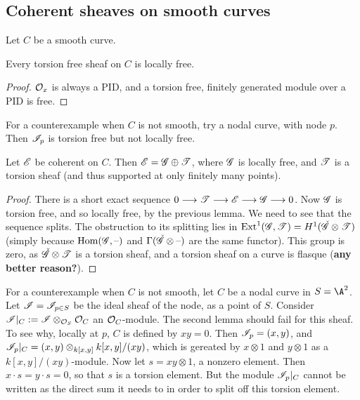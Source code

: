 \documentclass[11pt]{article}
\begin{document}
\subsection*{Coherent sheaves on smooth curves}
Let $C$ be a smooth curve.
\begin{lem*}
Every torsion free sheaf on $C$ is locally free.
\end{lem*}
\begin{proof}
$\mathcal{O}_x$ is always a PID, and a torsion free, finitely generated module over a
PID is free.
\end{proof}
\noindent
For a counterexample when $C$ is not smooth, try a nodal curve, with node $p$.
Then $\mathscr{I}_p$ is torsion free but not locally free.
\begin{lem*}
Let $\mathscr{E}$ be coherent on $C$. Then $\mathscr{E}=\mathscr{G}\oplus\mathscr{T}$, where $\mathscr{G}$ is
locally free, and $\mathscr{T}$ is a torsion sheaf (and thus supported at only
finitely many points).
\end{lem*}
\begin{proof}
There is a short exact sequence $0\longrightarrow \mathscr{T}\longrightarrow\mathscr{E}\longrightarrow\mathscr{G}\longrightarrow0$. Now $\mathscr{G}$ is
torsion free, and so locally free, by the previous lemma. We need to see that
the sequence splits. The obstruction to its splitting lies in
$\operatorname{Ext}^1(\mathscr{G},\mathscr{T})=H^1(\check{\mathscr{G}}\otimes\mathscr{T})$ (simply because
$\operatorname{Hom}(\mathscr{G},\textup{--})$ and $\Gamma(\check{\mathscr{G}}\otimes\textup{--})$ are the same functor).
This group is zero, as $\check{\mathscr{G}}\otimes\mathscr{T}$ is a torsion sheaf, and a
torsion sheaf on a curve is flasque (\textbf{any better reason?}).
\end{proof}
\noindent For a counterexample when $C$ is not smooth, let $C$ be a nodal curve
in $S=\A^2$. Let $\mathscr{I}=\mathscr{I}_{p\in S}$ be the ideal sheaf of the node, as a
point of $S$. Consider $\mathscr{I}|_C:=\mathscr{I}\otimes_{\mathcal{O}_S}\mathcal{O}_C$ an
$\mathcal{O}_C$-module. The second lemma should fail for this sheaf. To see why,
locally at $p$, $C$ is defined by $xy=0$. Then $\mathscr{I}_p=(x,y)$, and
$\mathscr{I}_p|_C=(x,y)\otimes_{k[x,y]}k[x,y]/(xy)$, which is gereated by $x\otimes1$
and $y\otimes1$ as a $k[x,y]/(xy)$-module. Now let $s=xy\otimes1$, a nonzero
element. Then $x\cdot s=y\cdot s=0$, so that $s$ is a torsion element. But the
module $\mathscr{I}_p|_C$ cannot be written as the direct sum it needs to in order to
split off this torsion element.
\end{document}

